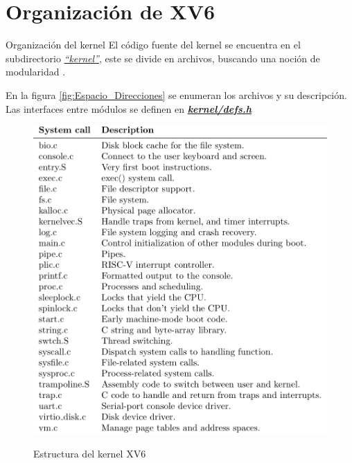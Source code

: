 \documentclass{libs/ufc_format}
\begin{document}
\section{Organización de XV6}
\begin{frame}{Organización del kernel}
    El código fuente del kernel se encuentra en el subdirectorio \href{https://github.com/CarlosSandoval-03/xv6-riscv/tree/riscv/kernel}{\textit{“kernel”}}, este se divide en archivos, buscando una noción de modularidad \cite{xv6_book}.

    \vspace{0.3cm}

    En la figura \ref{fig:Espacio_Direcciones} se enumeran los archivos y su descripción. Las interfaces entre módulos se definen en \href{https://github.com/CarlosSandoval-03/xv6-riscv/blob/riscv/kernel/defs.h}{\textit{\textbf{kernel/defs.h}}}
\end{frame}
\begin{frame}
    \begin{figure}
        \centering
        \caption{Estructura del kernel XV6}
        \includegraphics[scale=0.55]{libs/img/estructura_kernel.png}
        \label{fig:Estructura_Kernel}
    \end{figure}
\end{frame}
\end{document}
